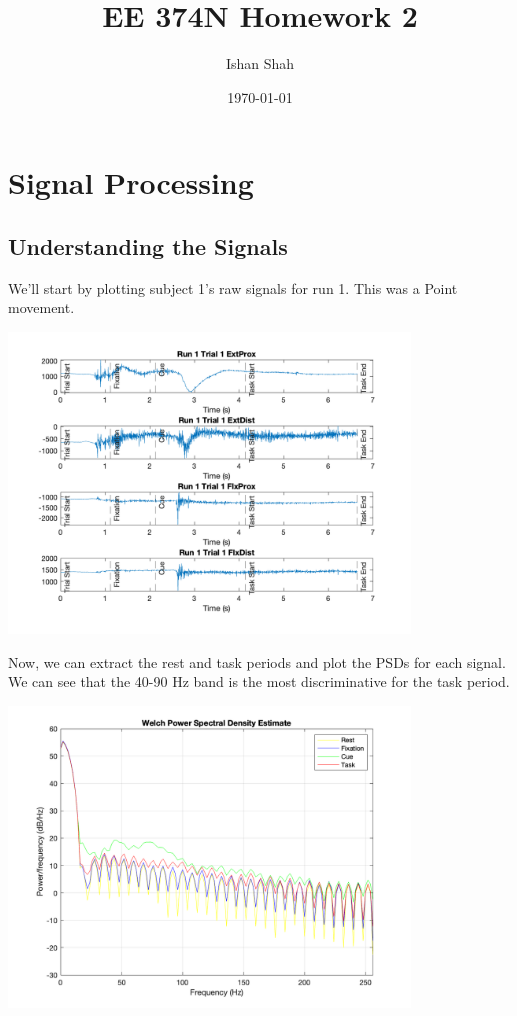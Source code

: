 \documentclass[12pt]{article}
\begin{document}
\title{EE 374N Homework 2}
\author{Ishan Shah}
\date{\today}
\maketitle

\section{Signal Processing}
\subsection{Understanding the Signals}
We'll start by plotting subject 1's raw signals for run 1. This was a Point movement.

\begin{center}
    \includegraphics[width=0.8\textwidth]{raw_signals.png}
\end{center}

Now, we can extract the rest and task periods and plot the PSDs for each signal. We can see that the 40-90 Hz band is the most discriminative for the task period.

\begin{center}
    \includegraphics[width=0.8\textwidth]{raw_welch.png}
\end{center}
\end{document}
